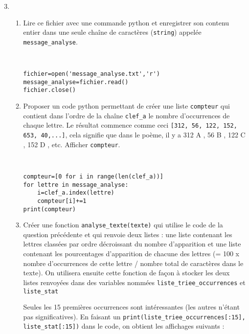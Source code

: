 \begin{enumerate}
\setcounter{enumi}{2}
\item \begin{enumerate}
\item Lire ce fichier avec une commande python et enregistrer son contenu entier dans une seule chaîne de caractères (\texttt{string}) appelée \verb?message_analyse?.
\begin{solution}~\ \\
\begin{verbatim}
fichier=open('message_analyse.txt','r')
message_analyse=fichier.read()
fichier.close()
\end{verbatim}
\end{solution}

\item Proposer un code python permettant de créer une liste \verb?compteur? qui contient dans l'ordre de la chaîne \verb?clef_a? le nombre d’occurrences de chaque lettre. Le résultat commence comme ceci \verb?[312, 56, 122, 152, 653, 40,...]?, cela signifie que dans le poème, il y a 312 \og A \fg, 56 \og B \fg, 122 \og C \fg, 152 \og D \fg, etc. Afficher \verb?compteur?.
\begin{solution}~\ \\
\begin{verbatim}
compteur=[0 for i in range(len(clef_a))]
for lettre in message_analyse:
    i=clef_a.index(lettre)
    compteur[i]+=1
print(compteur)
\end{verbatim}
\end{solution}

\item Créer une fonction \verb?analyse_texte(texte)? qui utilise le code de la question précédente et qui renvoie deux listes : une liste contenant les lettres classées par ordre décroissant du nombre d'apparition et une liste contenant les pourcentages d'apparition de chacune des lettres (= 100 x nombre d'occurrences de cette lettre / nombre total de caractères dans le texte). On utilisera ensuite cette fonction de façon à stocker les deux listes renvoyées dans des variables nommées \verb?liste_triee_occurrences? et \verb?liste_stat?

Seules les 15 premières occurrences sont intéressantes (les autres n'étant pas significatives). En faisant un \verb?print(liste_triee_occurrences[:15], liste_stat[:15])? dans le code, on obtient les affichages suivants :


\end{enumerate}
\end{enumerate}
